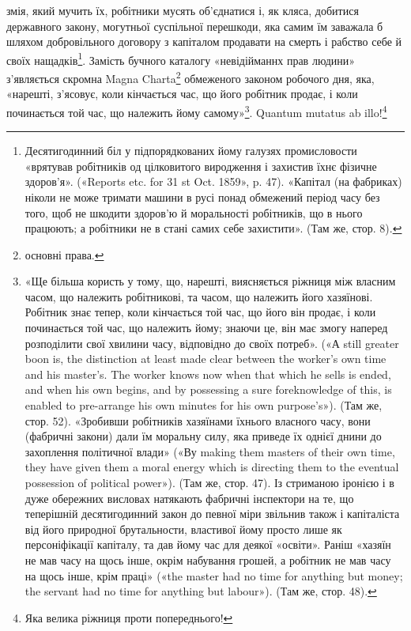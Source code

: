 змія, який мучить їх, робітники мусять об’єднатися і, як кляса,
добитися державного закону, могутньої суспільної перешкоди,
яка самим їм заважала б шляхом добровільного договору з капіталом
продавати на смерть і рабство себе й своїх нащадків\footnote{
Десятигодинний біл у підпорядкованих йому галузях промисловости
«врятував робітників од цілковитого виродження і захистив їхнє
фізичне здоров’я». («Reports etc. for 31 st Oct. 1859», p. 47). «Капітал
(на фабриках) ніколи не може тримати машини в русі понад обмежений
період часу без того, щоб не шкодити здоров’ю й моральності робітників,
що в нього працюють; а робітники не в стані самих себе захистити».
(Там же, стор. 8).
}.
Замість бучного каталогу «невідійманнх прав людини» з’являється
скромна Magna Charta\footnote*{
основні права. 
} обмеженого законом робочого
дня, яка, «нарешті, з’ясовує, коли кінчається час, що його робітник
продає, і коли починається той час, що належить йому самому»\footnote{
«Ще більша користь у тому, що, нарешті, виясняється ріжниця
між власним часом, що належить робітникові, та часом, що належить
його хазяїнові. Робітник знає тепер, коли кінчається той час, що його
він продає, і коли починається той час, що належить йому; знаючи це,
він має змогу наперед розподілити свої хвилини часу, відповідно до своїх
потреб». («А still greater boon is, the distinction at least made clear between
the worker’s own time and his master’s. The worker knows now when
that which he sells is ended, and when his own begins, and by possessing a sure
foreknowledge of this, is enabled to pre-arrange his own minutes for his
own purpose’s»). (Там же, стор. 52). «Зробивши робітників хазяїнами
їхнього власного часу, вони (фабричні закони) дали їм моральну силу,
яка приведе їх однієї днини до захоплення політичної влади» («Ву
making them masters of their own time, they have given them a moral energy
which is directing them to the eventual possession of political power»).
(Там же, стор. 47). Із стриманою іронією і в дуже обережних висловах
натякають фабричні інспектори на те, що теперішній десятигодинний
закон до певної міри звільнив також і капіталіста від його природної
брутальности, властивої йому просто лише як персоніфікації капіталу, та
дав йому час для деякої «освіти». Раніш «хазяїн не мав часу на щось
інше, окрім набування грошей, а робітник не мав часу на щось інше,
крім праці» («the master had no time for anything but money; the servant
had no time for anything but labour»). (Там же, стор. 48).
}.
Quantum mutatus ab illo!\footnote*{
Яка велика ріжниця проти попереднього! 
}
